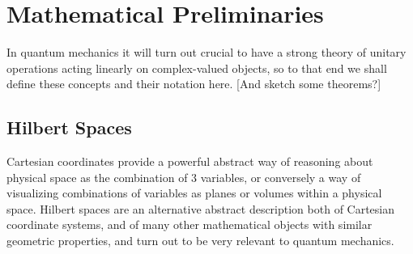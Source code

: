 
\chapter[MATHEMATICAL PRELIMINARIES]{Mathematical Preliminaries}
\label{Chap:Math}
In quantum mechanics it will turn out crucial to have a strong theory of unitary operations acting linearly on complex-valued objects, so to that end we shall define these concepts and their notation here. [And sketch some theorems?]
\section{Hilbert Spaces}
Cartesian coordinates provide a powerful abstract way of reasoning about physical space as the combination of 3 variables, or conversely a way of visualizing combinations of variables as planes or volumes within a physical space. Hilbert spaces are an alternative abstract description both of Cartesian coordinate systems, and of many other mathematical objects with similar geometric properties, and turn out to be very relevant to quantum mechanics.


